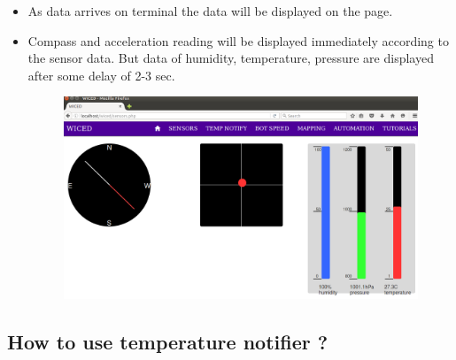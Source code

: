 \documentclass[11pt,a4paper]{article}
\begin{document}
\begin{itemize}
	 \item As data arrives on terminal the data will be displayed on the page.
	 
	 \newpage 
	 \item Compass and acceleration reading will be displayed immediately according to the sensor data. But data of humidity, temperature, pressure are displayed after some delay of 2-3 sec.
	 
	 \begin{figure}[h]
    \centering
	\includegraphics[scale=0.3]{sensor.png}
	\end{figure}
	 \end{itemize}
	 
	 
	 
	 \newpage
	 \subsection{How to use temperature notifier ?}
	 
\end{document}
